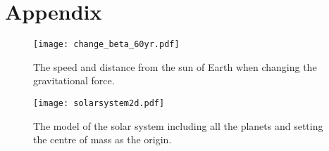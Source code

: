\onecolumn
\setcounter{equation}{0}
\renewcommand\theequation{A.\arabic{equation}}
\section*{Appendix}
\label{sec:appendix}

\begin{figure}[htbp]
	\centering
	\texttt{[image: change\_beta\_60yr.pdf]}
	\caption{The speed and distance from the sun of Earth when changing the gravitational force.}
	\label{fig:changing beta60}
\end{figure}

\begin{figure}[htbp]
	\centering
	\texttt{[image: solarsystem2d.pdf]}
	\caption{The model of the solar system including all the planets and setting the centre of mass as the origin.}
	\label{fig:solar system2d}
\end{figure}